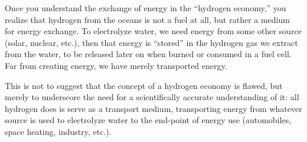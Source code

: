 Once you understand the exchange of energy in the ``hydrogen economy,'' you realize that hydrogen from the oceans is not a fuel at all, but rather a medium for energy exchange.  To electrolyze water, we need energy from some other source (solar, nuclear, etc.), then that energy is ``stored'' in the hydrogen gas we extract from the water, to be released later on when burned or consumed in a fuel cell.  Far from creating energy, we have merely transported energy.

This is not to suggest that the concept of a hydrogen economy is flawed, but merely to underscore the need for a scientifically accurate understanding of it: all hydrogen does is serve as a transport medium, transporting energy from whatever source is used to electrolyze water to the end-point of energy use (automobiles, space heating, industry, etc.).











